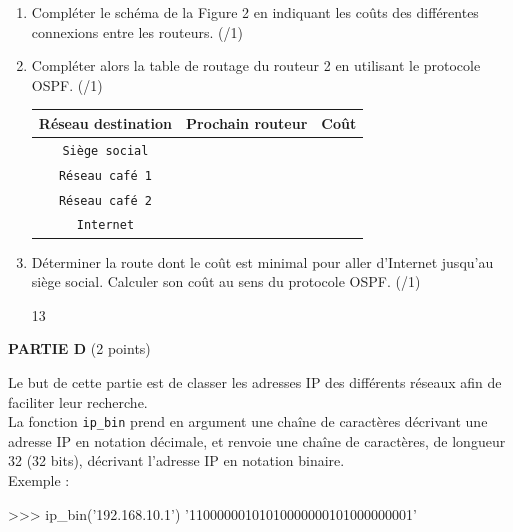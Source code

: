 \documentclass[a4paper,10pt]{report}
\renewcommand{\arraystretch}{1}  %
\begin{document}
\begin{enumerate}[resume]
    \item Compléter le schéma de la Figure 2 en indiquant les coûts des différentes connexions entre les routeurs. (/1)
    \item Compléter alors la table de routage du routeur 2 en utilisant le protocole OSPF. (/1)
\renewcommand{\arraystretch}{1.5}
\begin{center}
    \begin{tabular}{|c|c|c|}
        \hline
        \textbf{Réseau destination}  & \textbf{Prochain routeur} & \textbf{Coût}\\ \hline
        \verb|Siège social| & &  \\ \hline
        \verb|Réseau café 1| & &  \\ \hline
        \verb|Réseau café 2| & &  \\ \hline
        \verb|Internet| & &  \\ \hline
   
        \hline
    \end{tabular}
\end{center}

\item Déterminer la route dont le coût est minimal pour aller d'Internet jusqu'au siège social. Calculer son coût au sens du protocole OSPF. (/1)


        \begin{answer}{1}{3}    \end{answer}

    \end{enumerate}


    \pagebreak
\thispagestyle{DS_LP}
    \textbf{PARTIE D} \dotfill (2 points)

    \medskip

    Le but de cette partie est de classer les adresses IP des différents réseaux afin de faciliter leur recherche.\\

La fonction \verb|ip_bin| prend en argument une chaîne de caractères décrivant une adresse IP en notation décimale, et renvoie une chaîne de caractères, de longueur 32 (32 bits), décrivant l'adresse IP en notation binaire.\\

Exemple :

\begin{CodePythontexAlt}[TaillePolice=\large, Largeur=1\linewidth,Centre,Lignes=true,PremLigne=1]{}
	>>> ip_bin('192.168.10.1') 
    '11000000101010000000101000000001'

	\end{CodePythontexAlt}
\end{document}
